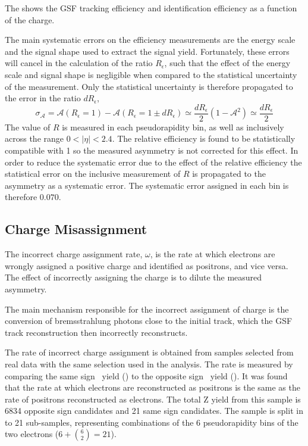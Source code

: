 The  shows the GSF tracking efficiency and identification 
efficiency as a function of the charge.


The main systematic errors on the efficiency measurements are the energy scale
and the signal shape used to extract the signal yield. Fortunately, these
errors will cancel in the calculation of the ratio $R_\epsilon$, such that the
effect of the energy scale and signal shape is negligible
when compared to the statistical uncertainty of the measurement. Only the
statistical uncertainty is therefore propagated to the error in the ratio
$dR_\epsilon$,
\begin{equation}
  \label{eq:releff}
  \sigma_{\mathcal{A}} 
  = \mathcal{A}(R_\epsilon=1) - \mathcal{A}(R_\epsilon=1\pm dR_\epsilon)  
  \simeq \frac{dR_\epsilon}{2}(1-\mathcal{A}^2)
  \simeq \frac{dR_\epsilon}{2} 
\end{equation}
The value of $R$ is measured in each pseudorapidity bin, as well as inclusively
across the range $0<| \eta |< 2.4$. 
The relative efficiency is found to be statistically compatible with 1 so the
measured asymmetry is not corrected for this effect.
In order to reduce the systematic error due to the effect of the relative
efficiency the statistical error on the inclusive measurement of $R$ is
propagated to the asymmetry as a systematic error. The systematic error assigned
in each bin is therefore $0.070$.

\subsection{Charge Misassignment}

The incorrect charge assignment rate, $\omega$, is the rate at which electrons are
wrongly assigned a positive charge and identified as positrons, and vice versa.
The effect of incorrectly assigning the charge is to dilute the measured
asymmetry.

The main mechanism responsible for the incorrect assignment of charge is the
conversion of bremsstrahlung photons close to the initial track, which the GSF
track reconstruction then incorrectly reconstructs.

The rate of incorrect charge assignment is obtained from \Zee samples selected from
real data  with the same selection used in the analysis. 
The rate is measured by comparing the
same sign \PZ\ yield (\HepProcess{\PZ\to\Pepm\Pepm}) to the opposite sign \PZ\
yield (\HepProcess{\PZ\to\Pepm\Pemp}).
It was found that the rate at which electrons are reconstructed as positrons is
the same as the rate of positrons reconstructed as electrons.
The total Z yield from this sample is 6834 opposite sign \PZ candidates and 21
same sign \PZ candidates.
The sample is split in to 21 sub-samples, representing
combinations of the 6 pseudorapidity bins of the two electrons ($6+\binom{6}{2} =
21$).

